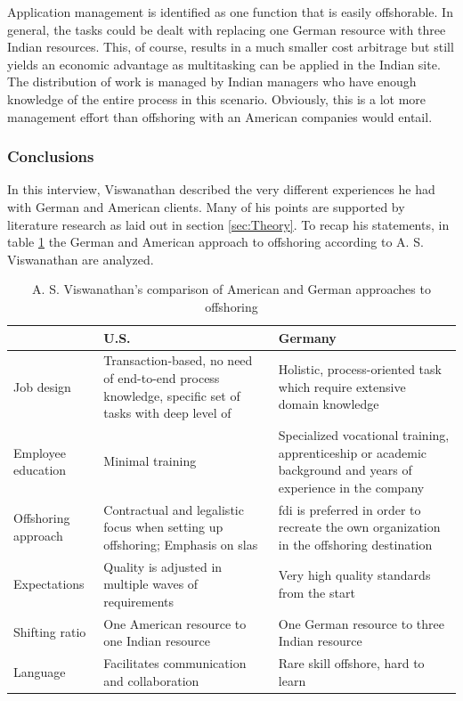 Application management is identified as one function that is easily offshorable. In general, the tasks could be dealt with replacing one German resource with three Indian resources. This, of course, results in a much smaller cost arbitrage but still yields an economic advantage as multitasking can be applied in the Indian site. The distribution of work is managed by Indian managers who have enough knowledge of the entire process in this scenario. Obviously, this is a lot more management effort than offshoring with an American companies would entail.

\subsubsection{Conclusions}
In this interview, Viswanathan described the very different experiences he had with German and American clients. Many of his points are supported by literature research as laid out in section \ref{sec:Theory}. To recap his statements, in table \ref{tab:ViswanathanComparison} the German and American approach to offshoring according to A. S. Viswanathan are analyzed.

\vspace{3mm}
\begin{table}[htb]
	\centering
	\begin{tabular}{l|p{5.55cm}|p{5.55cm}}
		& \textbf{U.S.} & \textbf{Germany}\\\hline
		\rule{0pt}{3ex}Job design& Transaction-based, no need of end-to-end process knowledge, specific set of tasks with deep level of  &Holistic, process-oriented task which require extensive domain knowledge\\ \hline
		\rule{0pt}{3ex}Employee education&Minimal training &Specialized vocational training, apprenticeship or academic background and years of experience in the company \\ \hline
		\rule{0pt}{3ex}Offshoring approach&Contractual and legalistic focus when setting up offshoring; Emphasis on \glspl{sla} &\gls{fdi} is preferred in order to recreate the own organization in the offshoring destination \\ \hline
		\rule{0pt}{3ex}Expectations&Quality is adjusted in multiple waves of requirements &Very high quality standards from the start\\ \hline
		\rule{0pt}{3ex}Shifting ratio& One American resource to one Indian resource & One German resource to three Indian resource\\ \hline
		\rule{0pt}{3ex}Language&Facilitates communication and collaboration &Rare skill offshore, hard to learn \\ \hline
	\end{tabular}
	\vspace{3mm}
	\caption{A. S. Viswanathan's comparison of American and German approaches to offshoring}
	\label{tab:ViswanathanComparison}
\end{table}

